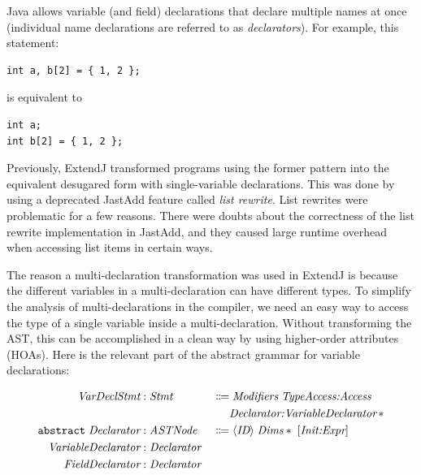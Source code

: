 \documentclass[10pt, twoside, openright]{book}
\begin{document}

Java allows variable (and field) declarations that declare multiple names at once (individual name
declarations are referred to as \emph{declarators}).
For example, this statement:

\begin{lstlisting}
int a, b[2] = { 1, 2 };
\end{lstlisting}

\noindent
is equivalent to

\begin{lstlisting}
int a;
int b[2] = { 1, 2 };
\end{lstlisting}

\noindent
Previously, ExtendJ transformed programs using the former pattern into the equivalent desugared form
with single-variable declarations.
This was done by using a deprecated JastAdd feature called \emph{list rewrite}.
List rewrites were problematic for a few reasons. There were doubts about the correctness
of the list rewrite implementation in JastAdd, and they caused large runtime overhead when
accessing list items in certain ways.

The reason a multi-declaration transformation was used in ExtendJ
is because the different variables in a multi-declaration can have different types.
To simplify the analysis of multi-declarations in the compiler, we need an easy way
to access the type of a single variable inside a multi-declaration.
Without transforming the AST, this can be accomplished in a clean way by using higher-order
attributes (HOAs).  Here is the relevant part of the abstract grammar for variable declarations:

\begin{alignat*}{2}
\textit{VarDeclStmt} : & \; \textit{Stmt} & \; \Coloneqq & \; \textit{Modifiers}\;\textit{TypeAccess:Access} \\
& & & \textit{Declarator:VariableDeclarator}\,\ast \\
\texttt{abstract} \; \textit{Declarator} : & \; \textit{ASTNode} & \; \Coloneqq & \; \langle\textit{\textit{ID}}\rangle \; \textit{Dims}\ast\;[\textit{Init:Expr}] \\
\textit{VariableDeclarator} : & \; \textit{Declarator} & & \\
\textit{FieldDeclarator} : & \; \textit{Declarator} & & \\
\end{alignat*}
\end{document}
